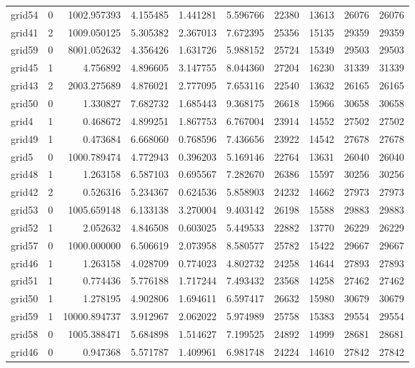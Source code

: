 \begin{longtable}{|l|r|r|r|r|r|r|r|r|r|}
grid54 & 0 & 1002.957393 & 4.155485 & 1.441281 & 5.596766 & 22380 & 13613 & 26076 & 26076 \\
grid41 & 2 & 1009.050125 & 5.305382 & 2.367013 & 7.672395 & 25356 & 15135 & 29359 & 29359 \\
grid59 & 0 & 8001.052632 & 4.356426 & 1.631726 & 5.988152 & 25724 & 15349 & 29503 & 29503 \\
grid45 & 1 & 4.756892 & 4.896605 & 3.147755 & 8.044360 & 27204 & 16230 & 31339 & 31339 \\
grid43 & 2 & 2003.275689 & 4.876021 & 2.777095 & 7.653116 & 22540 & 13632 & 26165 & 26165 \\
grid50 & 0 & 1.330827 & 7.682732 & 1.685443 & 9.368175 & 26618 & 15966 & 30658 & 30658 \\
grid4 & 1 & 0.468672 & 4.899251 & 1.867753 & 6.767004 & 23914 & 14552 & 27502 & 27502 \\
grid49 & 1 & 0.473684 & 6.668060 & 0.768596 & 7.436656 & 23922 & 14542 & 27678 & 27678 \\
grid5 & 0 & 1000.789474 & 4.772943 & 0.396203 & 5.169146 & 22764 & 13631 & 26040 & 26040 \\
grid48 & 1 & 1.263158 & 6.587103 & 0.695567 & 7.282670 & 26386 & 15597 & 30256 & 30256 \\
grid42 & 2 & 0.526316 & 5.234367 & 0.624536 & 5.858903 & 24232 & 14662 & 27973 & 27973 \\
grid53 & 0 & 1005.659148 & 6.133138 & 3.270004 & 9.403142 & 26198 & 15588 & 29883 & 29883 \\
grid52 & 1 & 2.052632 & 4.846508 & 0.603025 & 5.449533 & 22882 & 13770 & 26229 & 26229 \\
grid57 & 0 & 1000.000000 & 6.506619 & 2.073958 & 8.580577 & 25782 & 15422 & 29667 & 29667 \\
grid46 & 1 & 1.263158 & 4.028709 & 0.774023 & 4.802732 & 24258 & 14644 & 27893 & 27893 \\
grid51 & 1 & 0.774436 & 5.776188 & 1.717244 & 7.493432 & 23568 & 14258 & 27462 & 27462 \\
grid50 & 1 & 1.278195 & 4.902806 & 1.694611 & 6.597417 & 26632 & 15980 & 30679 & 30679 \\
grid59 & 1 & 10000.894737 & 3.912967 & 2.062022 & 5.974989 & 25758 & 15383 & 29554 & 29554 \\
grid58 & 0 & 1005.388471 & 5.684898 & 1.514627 & 7.199525 & 24892 & 14999 & 28681 & 28681 \\
grid46 & 0 & 0.947368 & 5.571787 & 1.409961 & 6.981748 & 24224 & 14610 & 27842 & 27842 \\

\end{longtable}
